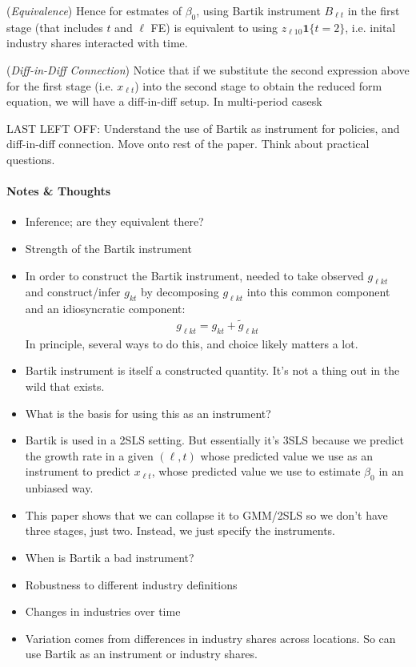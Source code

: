 \documentclass[12pt]{article}
\theoremstyle{plain}
\theoremstyle{definition}
\theoremstyle{remark}
\begin{document}
(\emph{Equivalence})
Hence for estmates of $\beta_0$, using Bartik instrument $B_{\ell t}$ in
the first stage (that includes $t$ and $\ell$ FE) is equivalent to using
$z_{\ell 10}\mathbf{1}\{t=2\}$, i.e. inital industry shares interacted
with time.

(\emph{Diff-in-Diff Connection})
Notice that if we substitute the second expression above for
the first stage (i.e. $x_{\ell t}$) into the second stage to obtain the
reduced form equation, we will have a diff-in-diff setup.
In multi-period casesk


LAST LEFT OFF:
Understand the use of Bartik as instrument for policies, and
diff-in-diff connection.
Move onto rest of the paper.
Think about practical questions.



\paragraph{Notes \& Thoughts}
\begin{itemize}
  \item Inference; are they equivalent there?
  \item Strength of the Bartik instrument
  \item In order to construct the Bartik instrument, needed to take
    observed $g_{\ell k t}$ and construct/infer $g_{kt}$ by decomposing
    $g_{\ell kt}$ into this common component and an idiosyncratic
    component:
    \begin{align*}
      g_{\ell kt} = g_{kt} + \tilde{g}_{\ell kt}
    \end{align*}
    In principle, several ways to do this, and choice likely matters a
    lot.
  \item Bartik instrument is itself a constructed quantity.
    It's not a thing out in the wild that exists.
  \item What is the basis for using this as an instrument?
  \item Bartik is used in a 2SLS setting.
    But essentially it's 3SLS because we predict the growth rate in a
    given $(\ell,t)$ whose predicted value we use as an instrument to
    predict $x_{\ell t}$, whose predicted value we use to estimate
    $\beta_0$ in an unbiased way.
  \item This paper shows that we can collapse it to GMM/2SLS so we don't
    have three stages, just two.
    Instead, we just specify the instruments.
  \item When is Bartik a bad instrument?
  \item Robustness to different industry definitions
  \item Changes in industries over time
  \item Variation comes from differences in industry shares across
    locations.
    So can use Bartik as an instrument or industry shares.
\end{itemize}
\end{document}
